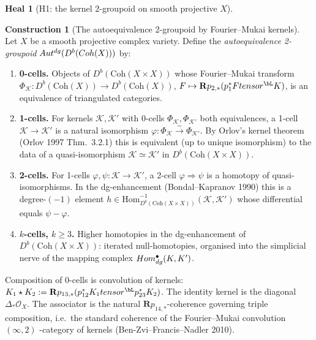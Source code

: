 \documentclass[11pt]{amsart}
\theoremstyle{definition}
\newtheorem{heal}[attack]{Heal}
\newtheorem{construction}[theorem]{Construction}
\providecommand{\Coh}{\mathrm{Coh}}
\providecommand{\Autdg}{\mathrm{Aut}^{\rm dg}}
\providecommand{\cO}{\mathcal{O}}
\providecommand{\cK}{\mathcal{K}}
\providecommand{\cF}{\mathcal{F}}
\providecommand{\bR}{\mathbf{R}}
\begin{document}
\begin{heal}[H1: the kernel 2-groupoid on smooth projective $X$]
\leavevmode

\begin{construction}[The autoequivalence 2-groupoid by Fourier--Mukai
kernels]\label{constr:auteq-2gpd}
Let $X$ be a smooth projective complex variety. Define the
\emph{autoequivalence 2-groupoid} $\Autdg(D^b(\Coh(X)))$ by:

\begin{enumerate}[label=(\roman*)]
 \item \textbf{0-cells.} Objects of $D^b(\Coh(X \times X))$ whose
   Fourier--Mukai transform
   $\Phi_{\cK} \colon D^b(\Coh(X)) \to D^b(\Coh(X))$,
   $\cF \mapsto \bR p_{2,*}(p_1^* \cF \otimes^{\bL} \cK)$,
   is an equivalence of triangulated categories.

 \item \textbf{1-cells.} For kernels $\cK, \cK'$ with 0-cells
   $\Phi_{\cK}, \Phi_{\cK'}$ both equivalences, a 1-cell
   $\cK \to \cK'$ is a natural isomorphism
   $\varphi \colon \Phi_{\cK} \xrightarrow{\sim} \Phi_{\cK'}$.
   By Orlov's kernel theorem (Orlov 1997 Thm.~3.2.1) this is
   equivalent (up to unique isomorphism) to the data of a
   quasi-isomorphism $\cK \simeq \cK'$ in $D^b(\Coh(X \times X))$.

 \item \textbf{2-cells.} For 1-cells
   $\varphi, \psi \colon \cK \to \cK'$, a 2-cell $\varphi \Rightarrow \psi$
   is a homotopy of quasi-isomorphisms. In the dg-enhancement
   (Bondal--Kapranov 1990) this is a degree-$(-1)$ element
   $h \in \mathrm{Hom}^{-1}_{D^b(\Coh(X \times X))}(\cK, \cK')$
   whose differential equals $\psi - \varphi$.

 \item \textbf{$k$-cells, $k \geq 3$.} Higher homotopies in the
   dg-enhancement of $D^b(\Coh(X \times X))$: iterated null-homotopies,
   organised into the simplicial nerve of the mapping complex
   $\mathrm{Hom}^\bullet_{\rm dg}(\cK, \cK')$.
\end{enumerate}

Composition of 0-cells is convolution of kernels:
$\cK_1 \star \cK_2 := \bR p_{13,*}(p_{12}^* \cK_1 \otimes^{\bL}
p_{23}^* \cK_2)$. The identity kernel is the diagonal
$\Delta_* \cO_X$. The associator is the natural
$\bR p_{14,*}$-coherence governing triple composition, i.e.\ the
standard coherence of the Fourier--Mukai convolution $(\infty, 2)$
-category of kernels (Ben-Zvi--Francis--Nadler 2010).
\end{construction}


\end{heal}
\end{document}
